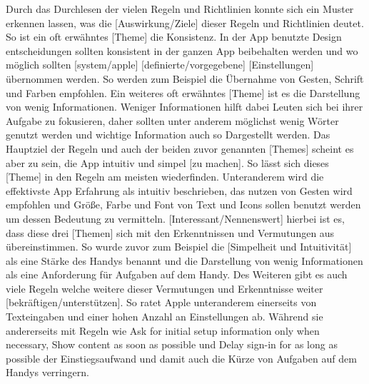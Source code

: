 {	\myNewSection
		Durch das Durchlesen der vielen Regeln und Richtlinien konnte sich ein Muster erkennen lassen, was die [Auswirkung/Ziele] dieser Regeln und Richtlinien deutet. %
			So ist ein oft erwähntes [Theme] die Konsistenz. In der App benutzte Design entscheidungen sollten konsistent in der ganzen App beibehalten werden und wo möglich sollten [system/apple] [definierte/vorgegebene] [Einstellungen] übernommen werden. So werden zum Beispiel die Übernahme von Gesten\cite{konventionen_accessibility}, Schrift\cite{konventionen_typography} und Farben\cite{konventionen_color} empfohlen.
			Ein weiteres oft erwähntes [Theme] ist es die Darstellung von wenig Informationen. Weniger Informationen \glqq hilft dabei Leuten sich bei ihrer Aufgabe zu fokusieren\grqq{}\cite{konventionen_platformIOS}, daher sollten unter anderem \glqq möglichst wenig Wörter genutzt werden\grqq{}\cite{konventionen_writing} und \glqq wichtige Information auch so Dargestellt werden\grqq{}\cite{konventionen_layout}.
			Das Hauptziel der Regeln und auch der beiden zuvor genannten [Themes] scheint es aber zu sein, die App intuitiv und simpel [zu machen]. So lässt sich dieses [Theme] in den Regeln am meisten wiederfinden. Unteranderem wird die effektivste App Erfahrung als intuitiv beschrieben\cite{konventionen_offeringHelp}, das nutzen von Gesten wird empfohlen\cite{konventionen_accessibility} und Größe, Farbe und Font von Text und Icons sollen benutzt werden um dessen Bedeutung zu vermitteln\cite{konventionen_icons, konventionen_typography}. 
		[Interessant/Nennenswert] hierbei ist es, dass diese drei [Themen] sich mit den Erkenntnissen und Vermutungen aus  übereinstimmen. So wurde zuvor zum Beispiel die [Simpelheit und Intuitivität] als eine Stärke des Handys benannt und die Darstellung von wenig Informationen als eine Anforderung für Aufgaben auf dem Handy.
		Des Weiteren gibt es auch viele Regeln welche weitere dieser Vermutungen und Erkenntnisse weiter [bekräftigen/unterstützen].
			So ratet Apple unteranderem einerseits von Texteingaben und einer hohen Anzahl an Einstellungen ab\cite{konventionen_enteringDate,konventionen_settings}. 
			Während sie andererseits mit Regeln wie \glqq Ask for initial setup information only when necessary\grqq{}\cite{konventionen_launching}, \glqq Show content as soon as possible\grqq{}\cite{konventionen_loading} und \glqq Delay sign-in for as long as possible\grqq{}\cite{konventionen_managing-accounts} der Einstiegsaufwand und damit auch die Kürze von Aufgaben auf dem Handys verringern.

}